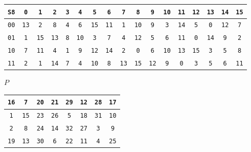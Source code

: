 \documentclass{article}
\begin{document}
\begin{center}
\vspace{10pt}
\begin{tabular}{|c|cccccccccccccccc|}
  \hline
\texttt{S8} & \texttt{0} & \texttt{1} & \texttt{2} & \texttt{3} & \texttt{4} & \texttt{5} & \texttt{6} & \texttt{7} & \texttt{8} & \texttt{9} & \texttt{10} & \texttt{11} & \texttt{12} & \texttt{13} & \texttt{14} & \texttt{15} \\
\hline
\texttt{0}\texttt{0} & \texttt{1}\texttt{3} & \texttt{2} & \texttt{8} & \texttt{4} & \texttt{6} & \texttt{1}\texttt{5} & \texttt{1}\texttt{1} & \texttt{1} & \texttt{1}\texttt{0} & \texttt{9} & \texttt{3} & \texttt{1}\texttt{4} & \texttt{5} & \texttt{0} & \texttt{1}\texttt{2} & \texttt{7} \\
\texttt{0}\texttt{1} & \texttt{1} & \texttt{1}\texttt{5} & \texttt{1}\texttt{3} & \texttt{8} & \texttt{1}\texttt{0} & \texttt{3} & \texttt{7} & \texttt{4} & \texttt{1}\texttt{2} & \texttt{5} & \texttt{6} & \texttt{1}\texttt{1} & \texttt{0} & \texttt{1}\texttt{4} & \texttt{9} & \texttt{2} \\
\texttt{1}\texttt{0} & \texttt{7} & \texttt{1}\texttt{1} & \texttt{4} & \texttt{1} & \texttt{9} & \texttt{1}\texttt{2} & \texttt{1}\texttt{4} & \texttt{2} & \texttt{0} & \texttt{6} & \texttt{1}\texttt{0} & \texttt{1}\texttt{3} & \texttt{1}\texttt{5} & \texttt{3} & \texttt{5} & \texttt{8} \\
\texttt{1}\texttt{1} & \texttt{2} & \texttt{1} & \texttt{1}\texttt{4} & \texttt{7} & \texttt{4} & \texttt{1}\texttt{0} & \texttt{8} & \texttt{1}\texttt{3} & \texttt{1}\texttt{5} & \texttt{1}\texttt{2} & \texttt{9} & \texttt{0} & \texttt{3} & \texttt{5} & \texttt{6} & \texttt{1}\texttt{1} \\
\hline
\end{tabular}

\vspace{20pt}

$P$ \\
\vspace{10pt}
\begin{tabular}{|cccccccc|}
\hline
\texttt{16} &  \texttt{7} &  \texttt{20} &  \texttt{21} &  \texttt{29} &  \texttt{12} &  \texttt{28} &  \texttt{17} \\
\hline
\texttt{1} &  \texttt{15} &  \texttt{23} &  \texttt{26} &  \texttt{5} &  \texttt{18} &  \texttt{31} &  \texttt{10} \\
\hline
\texttt{2} &  \texttt{8} &  \texttt{24} &  \texttt{14} &  \texttt{32} &  \texttt{27} &  \texttt{3} &  \texttt{9} \\
\hline
\texttt{19} &  \texttt{13} &  \texttt{30} &  \texttt{6} &  \texttt{22} &  \texttt{11} &  \texttt{4} &  \texttt{25} \\
\hline
\end{tabular}



\end{center}
\end{document}
